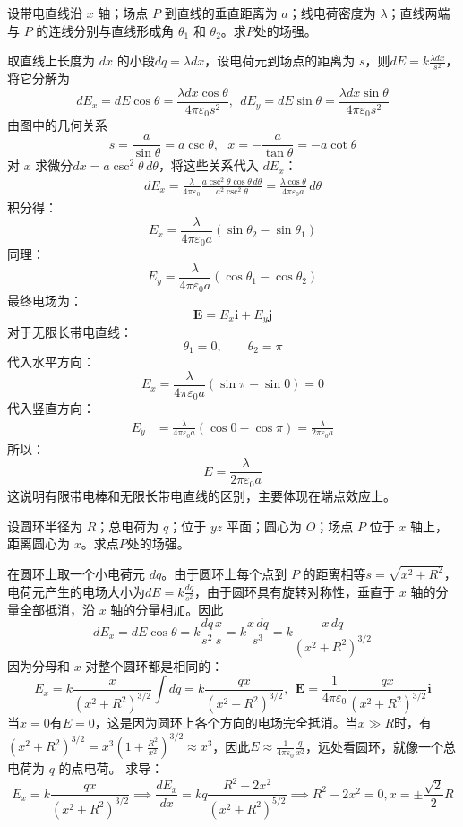 \documentclass[lang=cn,11pt]{elegantbook}
\begin{document}
\begin{exercise}
设带电直线沿 \(x\) 轴；场点 \(P\) 到直线的垂直距离为 \(a\)；线电荷密度为 \(\lambda\)；直线两端与 \(P\) 的连线分别与直线形成角 \(\theta_1\) 和 \(\theta_2\)。求$P$处的场强。
\end{exercise}
\begin{solution}
取直线上长度为 \(dx\) 的小段\(dq=\lambda dx\)，设电荷元到场点的距离为 \(s\)，则\(dE=k\frac{\lambda dx}{s^2}\)，将它分解为\[dE_x=dE\cos\theta=\frac{\lambda dx\cos\theta}{4\pi\varepsilon_0s^2},~~dE_y=dE\sin\theta=\frac{\lambda dx\sin\theta}{4\pi\varepsilon_0s^2}\]
由图中的几何关系\[s=\frac{a}{\sin\theta}=a\csc\theta,~~~x=-\frac{a}{\tan\theta}=-a\cot\theta\]
对 \(x\) 求微分\(dx=a\csc^2\theta\,d\theta\)，将这些关系代入 \(dE_x\)：\[
\begin{aligned}
dE_x=
\frac{\lambda}{4\pi\varepsilon_0}
\frac{a\csc^2\theta\cos\theta\,d\theta}
{a^2\csc^2\theta}=
\frac{\lambda\cos\theta}
{4\pi\varepsilon_0a}\,d\theta
\end{aligned}
\]积分得：
\[
\boxed{
E_x=
\frac{\lambda}
{4\pi\varepsilon_0a}
(\sin\theta_2-\sin\theta_1)
}
\]同理：
\[
\boxed{
E_y=
\frac{\lambda}
{4\pi\varepsilon_0a}
(\cos\theta_1-\cos\theta_2)
}
\]最终电场为：
\[
\mathbf E=E_x\mathbf i+E_y\mathbf j
\]对于无限长带电直线：
\[
\theta_1=0,\qquad\theta_2=\pi
\]代入水平方向：
\[
E_x=
\frac{\lambda}
{4\pi\varepsilon_0a}
(\sin\pi-\sin0)=0
\]代入竖直方向：
\[
\begin{aligned}
E_y
&=
\frac{\lambda}
{4\pi\varepsilon_0a}
(\cos0-\cos\pi)=
\frac{\lambda}
{2\pi\varepsilon_0a}
\end{aligned}
\]所以：
\[
\boxed{
E=\frac{\lambda}{2\pi\varepsilon_0a}
}
\]这说明有限带电棒和无限长带电直线的区别，主要体现在端点效应上。
\end{solution}

\begin{exercise}
设圆环半径为 \(R\)；总电荷为 \(q\)；位于 \(yz\) 平面；圆心为 \(O\)；场点 \(P\) 位于 \(x\) 轴上，距离圆心为 \(x\)。求点$P$处的场强。
\end{exercise}
\begin{solution}
在圆环上取一个小电荷元 \(dq\)。由于圆环上每个点到 \(P\) 的距离相等\(s=\sqrt{x^2+R^2}\)，电荷元产生的电场大小为\(dE=k\frac{dq}{s^2}\)，由于圆环具有旋转对称性，垂直于 \(x\) 轴的分量全部抵消，沿 \(x\) 轴的分量相加。因此\[dE_x=dE\cos\theta=k\frac{dq}{s^2}\frac{x}{s}=k\frac{x\,dq}{s^3}=k\frac{x\,dq}{(x^2+R^2)^{3/2}}\]因为分母和 \(x\) 对整个圆环都是相同的：\[E_x=k\frac{x}{(x^2+R^2)^{3/2}}\int dq
=k\frac{qx}{(x^2+R^2)^{3/2}},~~\boxed{\mathbf E=\frac{1}{4\pi\varepsilon_0}\frac{qx}{(x^2+R^2)^{3/2}}\mathbf i}\]当\(x=0\)有\(E=0\)，这是因为圆环上各个方向的电场完全抵消。当\(x\gg R\)时，有\((x^2+R^2)^{3/2}=x^3\left(1+\frac{R^2}{x^2}\right)^{3/2}\approx x^3\)，因此\(E\approx
\frac{1}{4\pi\varepsilon_0}\frac{q}{x^2}\)，远处看圆环，就像一个总电荷为 \(q\) 的点电荷。
求导：
\[E_x=k\frac{qx}{(x^2+R^2)^{3/2}}\implies\frac{dE_x}{dx}=kq\frac{R^2-2x^2}{(x^2+R^2)^{5/2}}
\implies R^2-2x^2=0,x=\pm\frac{\sqrt2}{2}R\]
\end{solution}
\end{document}
